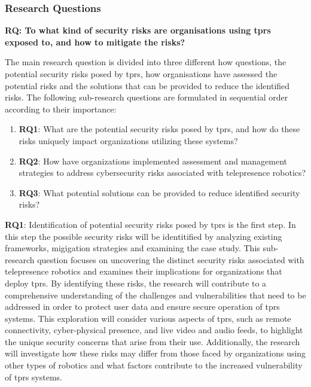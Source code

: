 \subsubsection{Research Questions}

\textbf{RQ: To what kind of security risks are organisations using \ac{tprs} exposed to, and how to mitigate the risks?}


The main research question is divided into three different how questions, the potential security risks posed by \ac{tprs}, how organisations
have assessed the potential risks and the solutions that can be provided to reduce the identified risks. The following sub-research
questions are formulated
in sequential order according to their importance:

\begin{enumerate}
  \item\textbf{RQ1}: What are the potential security risks posed by \ac{tprs}, and how do these risks uniquely impact organizations utilizing these systems?
  \item\textbf{RQ2}: How have organizations implemented assessment and management strategies to address cybersecurity risks associated with telepresence robotics?
  \item\textbf{RQ3}: What potential solutions can be provided to reduce identified security risks?
\end{enumerate}

\textbf{RQ1}: Identification of potential security risks posed by \ac{tprs} is the first step. In this step the possible security risks will be identitified by analyzing existing frameworks, migigation strategies and examining the case study. This sub-research question focuses on uncovering the distinct security risks associated with telepresence robotics and examines their implications for organizations that deploy \ac{tprs}.
  By identifying these risks, the research will contribute to a comprehensive understanding of the challenges and vulnerabilities that need to be addressed in order to protect user data and ensure secure operation of \ac{tprs} systems.
  This exploration will consider various aspects of \ac{tprs}, such as remote connectivity, cyber-physical presence, and live video and audio feeds, to highlight the unique security concerns that arise from their use.
  Additionally, the research will investigate how these risks may differ from those faced by organizations using other types of robotics and what factors contribute to the increased vulnerability of \ac{tprs} systems.

